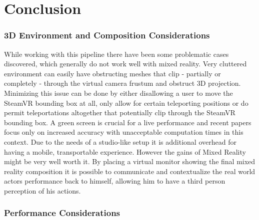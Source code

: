 %
\chapter{Conclusion}


\subsection{3D Environment and Composition Considerations}

While working with this pipeline there have been some problematic cases 
discovered, which generally do not work well with mixed reality. Very cluttered 
environment can easily have obstructing meshes that clip - partially or 
completely - through the virtual camera frustum and obstruct 3D projection. 
Minimizing this issue can be done by either disallowing a user to move the 
SteamVR bounding box at all, only allow for certain teleporting positions or do 
permit teleportations altogether that potentially clip through the SteamVR 
bounding box.
\newline
A green screen is crucial for a live performance and recent papers focus only 
on increased accuracy with unacceptable computation times in this context. Due 
to the needs of a studio-like setup it is additional overhead for having a 
mobile, transportable experience. However the gains of Mixed Reality might be 
very well worth it. 
\newline
By placing a virtual monitor showing the final mixed reality composition it is 
possible to communicate and contextualize the real world actors performance 
back to himself, allowing him to have a third person perception of his actions.

\subsection{Performance Considerations}

